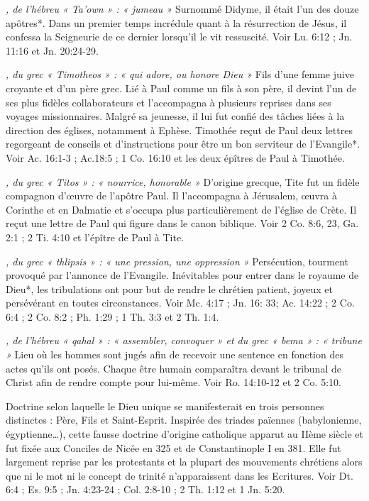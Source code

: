 \begin{multicols}{2}
{\textit{, de l'hébreu « Ta'own » : « jumeau »}\newline
Surnommé Didyme, il était l'un des douze apôtres*. Dans un premier temps incrédule quant à la résurrection de Jésus, il confessa la Seigneurie de ce dernier lorsqu'il le vit ressuscité. Voir Lu. 6:12 ; Jn. 11:16 et Jn. 20:24-29.

\textit{, du grec « Timotheos » : « qui adore, ou honore Dieu »}\newline
Fils d'une femme juive croyante et d'un père grec. Lié à Paul comme un fils à son père, il devint l'un de ses plus fidèles collaborateurs et l'accompagna à plusieurs reprises dans ses voyages missionnaires. Malgré sa jeunesse, il lui fut confié des tâches liées à la direction des églises, notamment à Ephèse. Timothée reçut de Paul deux lettres regorgeant de conseils et d'instructions pour être un bon serviteur de l'Evangile*. Voir Ac. 16:1-3 ; Ac.18:5 ; 1 Co. 16:10 et les deux épîtres de Paul à Timothée.

\textit{, du grec « Titos » : « nourrice, honorable »}\newline
D'origine grecque, Tite fut un fidèle compagnon d'œuvre de l'apôtre Paul. Il l'accompagna à Jérusalem, œuvra à Corinthe et en Dalmatie et s'occupa plus particulièrement de l'église de Crète. Il reçut une lettre de Paul qui figure dans le canon biblique. Voir 2 Co. 8:6, 23, Ga. 2:1 ; 2 Ti. 4:10 et l'épître de Paul à Tite.

\textit{, du grec « thlipsis » : « une pression, une oppression »}\newline
Persécution, tourment provoqué par l'annonce de l'Evangile. Inévitables pour entrer dans le royaume de Dieu*, les tribulations ont pour but de rendre le chrétien patient, joyeux et persévérant en toutes circonstances. Voir Mc. 4:17 ; Jn. 16: 33; Ac. 14:22 ; 2 Co. 6:4 ; 2 Co. 8:2 ; Ph. 1:29 ; 1 Th. 3:3 et 2 Th. 1:4.

\textit{, de l'hébreu « qahal » : « assembler, convoquer » et du grec « bema » : « tribune »}\newline
Lieu où les hommes sont jugés afin de recevoir une sentence en fonction des actes qu'ils ont posés. Chaque être humain comparaîtra devant le tribunal de Christ afin de rendre compte pour lui-même. Voir Ro. 14:10-12 et 2 Co. 5:10.

\textit{}\newline
Doctrine selon laquelle le Dieu unique se manifesterait en trois personnes distinctes : Père, Fils et Saint-Esprit. Inspirée des triades païennes (babylonienne, égyptienne…), cette fausse doctrine d'origine catholique apparut au IIème siècle et fut fixée aux Conciles de Nicée en 325 et de Constantinople I en 381. Elle fut largement reprise par les protestants et la plupart des mouvements chrétiens alors que ni le mot ni le concept de trinité n'apparaissent dans les Ecritures. Voir Dt. 6:4 ; Es. 9:5 ; Jn. 4:23-24 ; Col. 2:8-10 ; 2 Th. 1:12 et 1 Jn. 5:20.

}
\end{multicols}
